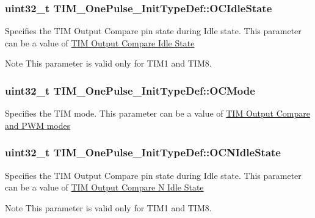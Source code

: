 \subsubsection[{\texorpdfstring{O\+C\+Idle\+State}{OCIdleState}}]{\setlength{\rightskip}{0pt plus 5cm}uint32\+\_\+t T\+I\+M\+\_\+\+One\+Pulse\+\_\+\+Init\+Type\+Def\+::\+O\+C\+Idle\+State}\hypertarget{struct_t_i_m___one_pulse___init_type_def_aef11bcea1dbf3e3ddf2a4bbc2846bb1e}{}\label{struct_t_i_m___one_pulse___init_type_def_aef11bcea1dbf3e3ddf2a4bbc2846bb1e}
Specifies the T\+IM Output Compare pin state during Idle state. This parameter can be a value of \hyperlink{group___t_i_m___output___compare___idle___state}{T\+IM Output Compare Idle State} \begin{DoxyNote}{Note}
This parameter is valid only for T\+I\+M1 and T\+I\+M8. 
\end{DoxyNote}
\subsubsection[{\texorpdfstring{O\+C\+Mode}{OCMode}}]{\setlength{\rightskip}{0pt plus 5cm}uint32\+\_\+t T\+I\+M\+\_\+\+One\+Pulse\+\_\+\+Init\+Type\+Def\+::\+O\+C\+Mode}\hypertarget{struct_t_i_m___one_pulse___init_type_def_af127f01162853e39ae616b43cc52b674}{}\label{struct_t_i_m___one_pulse___init_type_def_af127f01162853e39ae616b43cc52b674}
Specifies the T\+IM mode. This parameter can be a value of \hyperlink{group___t_i_m___output___compare__and___p_w_m__modes}{T\+IM Output Compare and P\+WM modes} 
\subsubsection[{\texorpdfstring{O\+C\+N\+Idle\+State}{OCNIdleState}}]{\setlength{\rightskip}{0pt plus 5cm}uint32\+\_\+t T\+I\+M\+\_\+\+One\+Pulse\+\_\+\+Init\+Type\+Def\+::\+O\+C\+N\+Idle\+State}\hypertarget{struct_t_i_m___one_pulse___init_type_def_a37bc0a680d53458bf4c42ebb277b0c2c}{}\label{struct_t_i_m___one_pulse___init_type_def_a37bc0a680d53458bf4c42ebb277b0c2c}
Specifies the T\+IM Output Compare pin state during Idle state. This parameter can be a value of \hyperlink{group___t_i_m___output___compare___n___idle___state}{T\+IM Output Compare N Idle State} \begin{DoxyNote}{Note}
This parameter is valid only for T\+I\+M1 and T\+I\+M8. 
\end{DoxyNote}
